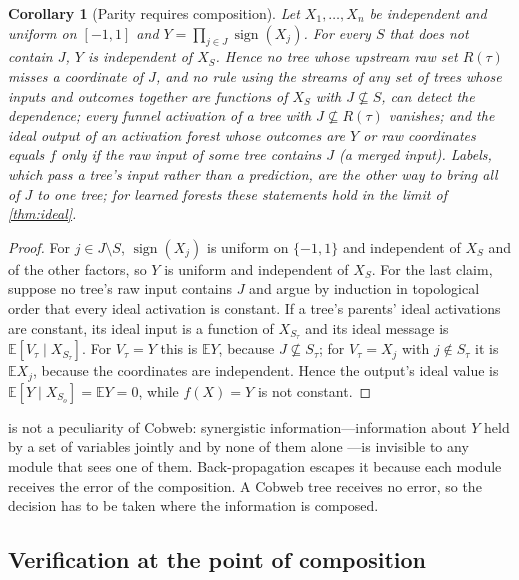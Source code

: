 \documentclass[11pt]{article}
\newtheorem{corollary}[theorem]{Corollary}
\theoremstyle{definition}
\theoremstyle{remark}
\newcommand{\E}{\mathbb{E}}
\begin{document}
\begin{corollary}[Parity requires composition]\label{cor:parity}
Let $X_1,\dots,X_n$ be independent and uniform on $[-1,1]$ and
$Y=\prod_{j\in J}\operatorname{sign}(X_j)$.  For every $S$ that does not contain $J$,
$Y$ is independent of $X_S$.  Hence no tree whose upstream raw set $R(\tau)$ misses a coordinate of $J$, and no rule
using the streams of any set of trees whose inputs and outcomes together are functions of
$X_S$ with $J\not\subseteq S$, can detect the dependence; every funnel activation of a tree
with $J\not\subseteq R(\tau)$ vanishes; and the ideal output of an activation forest whose outcomes are $Y$ or raw
coordinates equals $f$ only if the raw input of some tree contains $J$ (a merged input).
Labels, which pass a tree's input rather than a prediction, are the other way to bring all
of $J$ to one tree; for learned forests these statements hold in the limit of
\cref{thm:ideal}.
\end{corollary}
\begin{proof}
For $j\in J\setminus S$, $\operatorname{sign}(X_j)$ is uniform on $\{-1,1\}$ and
independent of $X_S$ and of the other factors, so $Y$ is uniform and independent of $X_S$.
For the last claim, suppose no tree's raw input contains $J$ and argue by induction in
topological order that every ideal activation is constant.  If a tree's parents' ideal
activations are constant, its ideal input is a function of $X_{S_\tau}$ and its ideal
message is $\E[V_\tau\mid X_{S_\tau}]$.  For $V_\tau=Y$ this is $\E Y$, because $J\not\subseteq
S_\tau$; for $V_\tau=X_j$ with $j\notin S_\tau$ it is $\E X_j$, because the coordinates are
independent.  Hence the output's ideal value is $\E[Y\mid X_{S_o}]=\E Y=0$, while
$f(X)=Y$ is not constant.
\end{proof}

 is not a peculiarity of Cobweb: synergistic information---information
about $Y$ held by a set of variables jointly and by none of them alone
\citep{williams2010}---is invisible to any module that sees one of them.  Back-propagation
escapes it because each module receives the error of the composition.  A Cobweb tree
receives no error, so the decision has to be taken where the information is composed.

\subsection{Verification at the point of composition}
\end{document}
